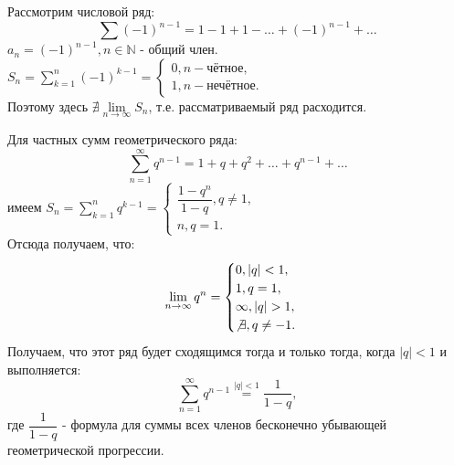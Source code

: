 \begin{examples}
        \item 
        Рассмотрим числовой ряд:
        \begin{equation*}
        \sum\limits (-1)^{n-1} = 1 - 1 + 1 - \ldots + (-1)^{n-1} + \ldots
        \end{equation*}
        $a_n = (-1)^{n-1}, n \in \mathbb{N}$ - общий член.\\
        $S_n = \sum\limits_{k=1}^{n}(-1)^{k-1} = \begin{cases}
        0, n - \text{чётное,} \\
        1, n - \text{нечётное.} \end{cases}$ \\
        Поэтому здесь $\nexists \lim\limits_{n \to \infty} S_n$, т.е. рассматриваемый ряд расходится.
        \item Для частных сумм геометрического ряда:
        \begin{equation*}
        \sum\limits_{n = 1}^{\infty} q^{n-1} = 1 + q + q^2 + \ldots + q^{n-1} + \ldots
        \end{equation*}
        имеем $S_n = \sum\limits_{k=1}^{n} q^{k-1} = \begin{cases}
        \dfrac{1 - q^n}{1-q}, q \ne 1, \\
        n, q = 1. \end{cases}$\\
        Отсюда получаем, что:
        \begin{equation*}
        \lim\limits_{n \to \infty} q^n = \begin{cases}
        0, |q| < 1, \\
        1, q = 1, \\
        \infty, |q| > 1, \\
        \not\exists, q \ne -1.
        \end{cases}
        \end{equation*}
        Получаем, что этот ряд будет сходящимся тогда и только тогда, когда $|q| < 1$ и выполняется:
        \begin{equation*}
        \sum\limits_{n=1}^{\infty} q^{n-1} \overset{|q|<1}{=}  \dfrac{1}{1-q},
        \end{equation*}			
        где $\dfrac{1}{1-q}$ - формула для суммы всех членов бесконечно убывающей геометрической прогрессии.
\end{examples}

